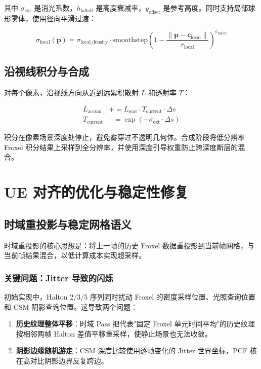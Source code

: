 \documentclass[11pt,a4paper]{article}
\begin{document}
其中 $\sigma_{\text{ext}}$ 是消光系数，$h_{\text{falloff}}$ 是高度衰减率，$y_{\text{offset}}$ 是参考高度。同时支持局部球形雾体，使用径向平滑过渡：

\begin{equation}
\sigma_{\text{local}}(\mathbf{p}) = \sigma_{\text{local\_density}} \cdot \text{smoothstep}\left(1 - \frac{\|\mathbf{p} - \mathbf{c}_{\text{local}}\|}{r_{\text{local}}}\right)^{e_{\text{falloff}}}
\end{equation}

\subsection{沿视线积分与合成}

对每个像素，沿视线方向从近到远累积散射 $L$ 和透射率 $T$：

\begin{align}
L_{\text{accum}} &\mathrel{+}= L_{\text{scat}} \cdot T_{\text{current}} \cdot \Delta s \\
T_{\text{current}} &\mathrel{\cdot}= \exp(-\sigma_{\text{ext}} \cdot \Delta s)
\end{align}

积分在像素场景深度处停止，避免雾穿过不透明几何体。合成阶段将低分辨率 Froxel 积分结果上采样到全分辨率，并使用深度引导权重防止跨深度断层的混合。

\section{UE 对齐的优化与稳定性修复}

\subsection{时域重投影与稳定网格语义}

时域重投影的核心思想是：将上一帧的历史 Froxel 数据重投影到当前帧网格，与当前帧结果混合，以低计算成本实现超采样。

\subsubsection{关键问题：Jitter 导致的闪烁}

初始实现中，Halton 2/3/5 序列同时扰动 Froxel 的密度采样位置、光照查询位置和 CSM 阴影查询位置。这导致两个问题：

\begin{enumerate}
    \item \textbf{历史纹理整体平移}：时域 Pass 把代表"固定 Froxel 单元时间平均"的历史纹理按相邻两帧 Halton 差值平移重采样，使静止场景也无法收敛。
    \item \textbf{阴影边缘随机游走}：CSM 深度比较使用逐帧变化的 Jitter 世界坐标，PCF 核在高对比阴影边界反复跨边。
\end{enumerate}
\end{document}
